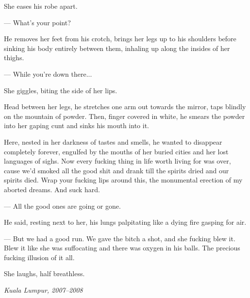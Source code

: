 \documentclass[11pt]{article}
\begin{document}
	She eases his robe apart. 
	
	--- What's your point?
	
	He removes her feet from his crotch, brings her legs up to his shoulders 
before sinking his body entirely between them, inhaling up along the insides of 
her thighs.	

	--- While you're down there...

	She giggles, biting the side of her lips.

	Head between her legs, he stretches one arm out towards the mirror, taps 
blindly on the mountain of powder. Then, finger covered in white, he smears the 
powder into her gaping cunt and sinks his mouth into it.

	Here, nested in her darkness of tastes and smells, he wanted to disappear 
completely forever, engulfed by the mouths of her buried cities and her lost 
languages of sighs. Now every fucking thing in life worth living for was over, 
cause we'd smoked all the good shit and drank till the spirits dried and our 
spirits died. Wrap your fucking lips around this, the monumental erection of my 
aborted dreams. And suck hard.

	--- All the good ones are going or gone.

	He said, resting next to her, his lungs palpitating like a dying fire 
gasping for air.

	--- But we had a good run. We gave the bitch a shot, and she fucking blew 
it. Blew it like she was suffocating and there was oxygen in his balls. The 
precious fucking illusion of it all.

	She laughs, half breathless.

	\begin{flushright}\emph{Kuala Lumpur, 2007--2008}\end{flushright}
\end{document}
